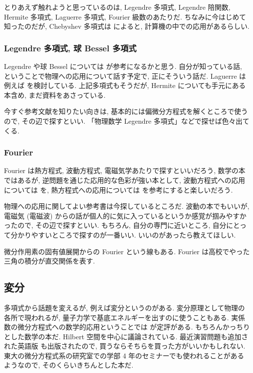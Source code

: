 \documentclass[openany, a4paper, oneside]{jsbook}
\theoremstyle{break}
\theoremstyle{breakdefn}
\begin{document}
とりあえず触れようと思っているのは, Legendre 多項式, Legendre 陪関数,
Hermite 多項式, Laguerre 多項式, Fourier 級数のあたりだ.
ちなみに今はじめて知ったのだが, Chebyshev 多項式は \cite{HiroshiTanaka1} によると, 計算機の中での応用があるらしい.
\subsubsection{Legendre 多項式, 球 Bessel 多項式}


Legendre や球 Bessel については \cite{NorikatsuMio1} が参考になるかと思う.
自分が知っている話, ということで物理への応用について話す予定で, 正にそういう話だ.
Laguerre は例えば \cite{KenichiKanaya1} を検討している.
上記多項式もそうだが, Hermite についても手元にある本含め, まだ資料をあさっている.

今すぐ参考文献を知りたい向きは, 基本的には偏微分方程式を解くところで使うので, その辺で探すといい.
「物理数学 Legendre 多項式」などで探せば色々出てくる.
\subsubsection{Fourier}


Fourier は熱方程式, 波動方程式, 電磁気学あたりで探すといいだろう,
数学の本ではあるが, 逆問題を通じた応用的な色彩が強い本として,
波動方程式への応用については \cite{NoborizakaOnishiYamamoto1} を,
熱方程式への応用については \cite{KimYamamoto1} を参考にすると楽しいだろう.

物理への応用に関してよい参考書は今探しているところだ.
波動の本でもいいが, 電磁気 (電磁波) からの話が個人的に気に入っているというか感覚が掴みやすかったので,
その辺で探すといい.
もちろん, 自分の専門に近いところ, 自分にとって分かりやすいところで探すのが一番いい.
いいのがあったら教えてほしい.

微分作用素の固有値展開からの Fourier という線もある.
Fourier は高校でやった三角の積分が直交関係を表す.
\subsection{変分}


多項式から話題を変えるが, 例えば変分というのがある.
変分原理として物理の各所で現われるが, 量子力学で基底エネルギーを出すのに使うこともある.
実係数の微分方程式への数学的応用ということでは \cite{HaimBrezis1} が定評がある.
もちろんかっちりとした数学の本だ.
Hilbert 空間を中心に議論されている.
最近演習問題も追加された英語版 \cite{HaimBrezis2} も出版されたので, 買うならそちらを買った方がいいかもしれない.
東大の微分方程式系の研究室での学部 4 年のセミナーでも使われることがあるようなので,
そのくらいきちんとした本だ.
\end{document}
